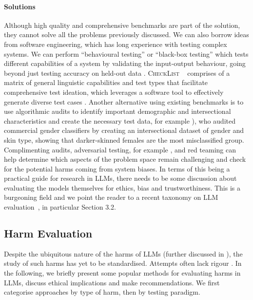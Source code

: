 \paragraph{Solutions}

Although high quality and comprehensive benchmarks are part of the solution, they cannot solve all the problems previously discussed. We can also borrow ideas from software engineering, which has long experience with testing complex systems. 
We can perform ``behavioural testing'' or ``black-box testing'' which tests different capabilities of a system by validating the input-output behaviour, going   beyond just testing accuracy on held-out data \citep{ribeiro_beyond_2020}. \textsc{CheckList} ~\citep{ribeiro_beyond_2020} comprises of a matrix of general linguistic capabilities and test types that facilitate comprehensive test ideation, which leverages a software tool to effectively generate diverse test cases \citep[see also][]{manerba_fine-grained_2021}. 
Another alternative using existing benchmarks is to use algorithmic audits to identify important demographic and intersectional characteristics and create the necessary test data, for example \citet{buolamwini_gender_2018}), who audited commercial gender classifiers by creating an intersectional dataset of gender and skin type, showing that darker-skinned females are the
most misclassified group.  
Complimenting audits, adversarial testing, for example \citet{niven-kao-2019-probing}, and red teaming \citep{ganguli_red_2022} can
help determine which aspects of the problem space remain challenging and check for the
potential harms coming from system biases.
In terms of this being a practical guide for research in LLMs, there needs to be some discussion about evaluating the models themselves for ethics, bias and trustworthiness. 
This is a burgeoning field and we point the reader to a recent taxonomy on LLM evaluation~\cite{chang_survey_2023}, in particular Section 3.2.  


\subsection{Harm Evaluation}\label{sec:harmeval}
Despite the ubiquitous nature of the harms of LLMs \citep{rauh_characteristics_2022, weidinger_ethical_2021} (further discussed in 
), the study of such harms has yet to be standardised. Attempts often lack rigour \citep{blodgett_language_2020,blodgett_stereotyping_2021,goldfarb-tarrant_this_2023}. In the following, we briefly present some popular methods for evaluating harms in LLMs, discuss ethical implications and make recommendations. We first categorise approaches by type of harm, then by testing paradigm. 

